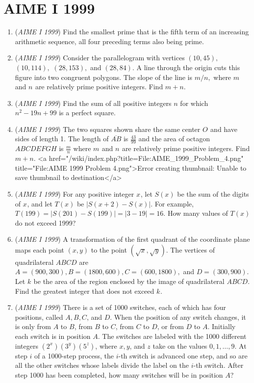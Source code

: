 \section{AIME I 1999}
        \begin{enumerate}
        	\item (\textit{AIME I 1999}) Find the smallest prime that is the fifth term of an increasing arithmetic sequence, all four preceding terms also being prime.


 

	\item (\textit{AIME I 1999}) Consider the parallelogram with vertices $(10,45),$ $(10,114),$ $(28,153),$ and $(28,84).$  A line through the origin cuts this figure into two congruent polygons.  The slope of the line is $m/n,$ where $m_{}$ and $n_{}$ are relatively prime positive integers.  Find $m+n.$


	\item (\textit{AIME I 1999}) Find the sum of all positive integers $n$ for which $n^2-19n+99$ is a perfect square.


 

	\item (\textit{AIME I 1999}) The two squares shown share the same center $O_{}$ and have sides of length 1. The length of $\overline{AB}$ is $\frac{43}{99}$ and the area of octagon $ABCDEFGH$ is $\frac{m}{n}$ where $m_{}$ and $n_{}$ are relatively prime positive integers.  Find $m+n.$
<a href="/wiki/index.php?title=File:AIME\_1999\_Problem\_4.png" title="File:AIME 1999 Problem 4.png">Error creating thumbnail: Unable to save thumbnail to destination</a>


	\item (\textit{AIME I 1999}) For any positive integer $x_{}$, let $S(x)$ be the sum of the digits of $x_{}$, and let $T(x)$ be $|S(x+2)-S(x)|.$  For example, $T(199)=|S(201)-S(199)|=|3-19|=16.$  How many values of $T(x)$ do not exceed 1999?


 

	\item (\textit{AIME I 1999}) A transformation of the first quadrant of the coordinate plane maps each point $(x,y)$ to the point $(\sqrt{x},\sqrt{y}).$  The vertices of quadrilateral $ABCD$ are $A=(900,300), B=(1800,600), C=(600,1800),$ and $D=(300,900).$  Let $k_{}$ be the area of the region enclosed by the image of quadrilateral $ABCD.$  Find the greatest integer that does not exceed $k_{}.$


	\item (\textit{AIME I 1999}) There is a set of 1000 switches, each of which has four positions, called $A, B, C$, and $D$.  When the position of any switch changes, it is only from $A$ to $B$, from $B$ to $C$, from $C$ to $D$, or from $D$ to $A$.  Initially each switch is in position $A$.  The switches are labeled with the 1000 different integers $(2^{x})(3^{y})(5^{z})$, where $x, y$, and $z$ take on the values $0, 1, \ldots, 9$.  At step $i$ of a 1000-step process, the $i$-th switch is advanced one step, and so are all the other switches whose labels divide the label on the $i$-th switch.  After step 1000 has been completed, how many switches will be in position $A$?



\end{enumerate}
